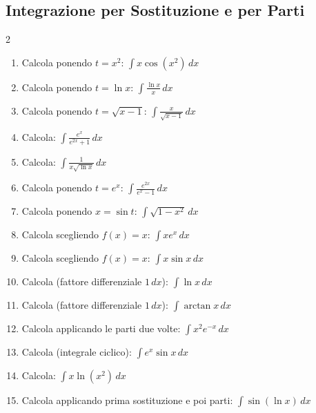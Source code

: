 \subsection{Integrazione per Sostituzione e per Parti}
\begin{multicols}{2}
\begin{enumerate}
    \item {} Calcola ponendo $t = x^2$: $\int x \cos(x^2) \, dx$
    \item {} Calcola ponendo $t = \ln x$: $\int \frac{\ln x}{x} \, dx$
    \item {} Calcola ponendo $t = \sqrt{x-1}$: $\int \frac{x}{\sqrt{x-1}} \, dx$
    \item {} Calcola: $\int \frac{e^x}{e^{2x} + 1} \, dx$
    \item {} Calcola: $\int \frac{1}{x \sqrt{\ln x}} \, dx$
    \item {} Calcola ponendo $t = e^x$: $\int \frac{e^{2x}}{e^x - 1} \, dx$
    \item {} Calcola ponendo $x = \sin t$: $\int \sqrt{1 - x^2} \, dx$
    
    \item {} Calcola scegliendo $f(x)=x$: $\int x e^x \, dx$
    \item {} Calcola scegliendo $f(x)=x$: $\int x \sin x \, dx$
    \item {} Calcola (fattore differenziale $1 \, dx$): $\int \ln x \, dx$
    \item {} Calcola (fattore differenziale $1 \, dx$): $\int \arctan x \, dx$
    \item {} Calcola applicando le parti due volte: $\int x^2 e^{-x} \, dx$
    \item {} Calcola (integrale ciclico): $\int e^x \sin x \, dx$
    \item {} Calcola: $\int x \ln(x^2) \, dx$
    \item {} Calcola applicando prima sostituzione e poi parti: $\int \sin(\ln x) \, dx$
\end{enumerate}
\end{multicols}

